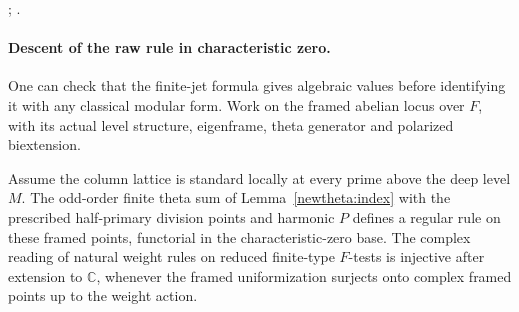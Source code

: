 ;
.

\paragraph{Descent of the raw rule in characteristic zero.}
One can check that the finite-jet formula gives algebraic values
before identifying it with any classical modular form. Work on
the framed abelian locus over \(F\), with its actual level
structure, eigenframe, theta generator and polarized biextension.

\begin{lemma}\label{bfam:rule}
Assume the column lattice is standard locally at every prime
above the deep level \(M\). The odd-order finite theta sum of Lemma~\ref{newtheta:index}
with the prescribed half-primary division points and harmonic \(P\)
defines a regular rule on these framed points, functorial in
the characteristic-zero base. The complex reading of natural
weight rules on reduced finite-type \(F\)-tests is injective after
extension to \(\mathbb C\), whenever the framed uniformization
surjects onto complex framed points up to the weight action.
\end{lemma}
